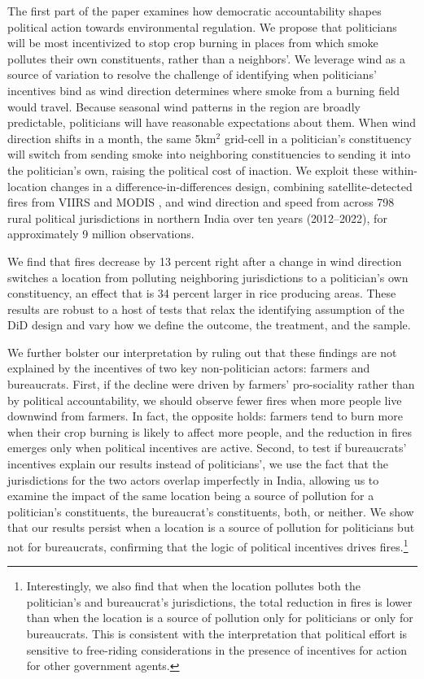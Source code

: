 \documentclass[12pt]{article}
\begin{document}
The first part of the paper examines how democratic accountability shapes political action towards environmental regulation. We propose that politicians will be most incentivized to stop crop burning in places from which smoke pollutes their own constituents, rather than a neighbors'. We leverage wind as a source of variation to resolve the challenge of identifying when politicians' incentives bind as wind direction determines where smoke from a burning field would travel. Because seasonal wind patterns in the region are broadly predictable, politicians will have reasonable expectations about them. When wind direction shifts in a month, the same 5km$^2$ grid-cell in a politician's constituency will switch from sending smoke into neighboring constituencies to sending it into the politician's own, raising the political cost of inaction. We exploit these within-location changes in a difference-in-differences design, combining satellite-detected fires from VIIRS and MODIS \citep{VIIRS_Instrument_Overview}, and wind direction and speed from \citet{ERA5_monthly_pressure_levels_2023} across 798 rural political jurisdictions in northern India over ten years (2012–2022), for approximately 9 million observations.


We find that fires decrease by 13 percent right after a change in wind direction switches a location from polluting neighboring jurisdictions to a politician's own constituency, an effect that is 34 percent larger in rice producing areas. These results are robust to a host of tests that relax the identifying assumption of the DiD design and vary how we define the outcome, the treatment, and the sample.

We further bolster our interpretation by ruling out that these findings are not explained by the incentives of two key non-politician actors: farmers and bureaucrats. First, if the decline were driven by farmers’ pro-sociality rather than by political accountability, we should observe fewer fires when more people live downwind from farmers. In fact, the opposite holds: farmers tend to burn more when their crop burning is likely to affect more people, and the reduction in fires emerges only when political incentives are active. Second, to test if bureaucrats' incentives explain our results instead of politicians', we use the fact that the jurisdictions for the two actors overlap imperfectly in India, allowing us to examine the impact of the same location being a source of pollution for a politician's constituents, the bureaucrat's constituents, both, or neither. We show that our results persist when a location is a source of pollution for politicians but not for bureaucrats, confirming that the logic of political incentives drives fires.\footnote{Interestingly, we also find that when the location pollutes both the politician's and bureaucrat's jurisdictions, the total reduction in fires is lower than when the location is a source of pollution only for politicians or only for bureaucrats. This is consistent with the interpretation that political effort is sensitive to free-riding considerations in the presence of incentives for action for other government agents.} 
\end{document}
